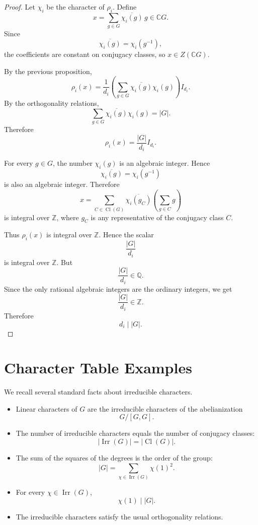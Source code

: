 \begin{proof}
Let \(\chi_i\) be the character of \(\rho_i\). Define
\[
x=\sum_{g\in G}\overline{\chi_i(g)}\,g\in \mathbb{C}G.
\]
Since
\[
\overline{\chi_i(g)}=\chi_i(g^{-1}),
\]
the coefficients are constant on conjugacy classes, so \(x\in Z(\mathbb{C}G)\).

By the previous proposition,
\[
\rho_i(x)
=
\frac{1}{d_i}
\left(\sum_{g\in G}\overline{\chi_i(g)}\chi_i(g)\right)I_{d_i}.
\]
By the orthogonality relations,
\[
\sum_{g\in G}\overline{\chi_i(g)}\chi_i(g)=|G|.
\]
Therefore
\[
\rho_i(x)=\frac{|G|}{d_i}I_{d_i}.
\]

For every \(g\in G\), the number \(\chi_i(g)\) is an algebraic integer. Hence
\[
\overline{\chi_i(g)}
=
\chi_i(g^{-1})
\]
is also an algebraic integer. Therefore
\[
x
=
\sum_{C\in \operatorname{Cl}(G)}
\overline{\chi_i(g_C)}
\left(\sum_{g\in C}g\right)
\]
is integral over \(\mathbb{Z}\), where \(g_C\) is any representative of the conjugacy class \(C\).

Thus \(\rho_i(x)\) is integral over \(\mathbb{Z}\). Hence the scalar
\[
\frac{|G|}{d_i}
\]
is integral over \(\mathbb{Z}\). But
\[
\frac{|G|}{d_i}\in \mathbb{Q}.
\]
Since the only rational algebraic integers are the ordinary integers, we get
\[
\frac{|G|}{d_i}\in \mathbb{Z}.
\]
Therefore
\[
d_i\mid |G|.
\]
\end{proof}

\section{Character Table Examples}

We recall several standard facts about irreducible characters.

\begin{itemize}
\item Linear characters of \(G\) are the irreducible characters of the abelianization
\[
G/[G,G].
\]

\item The number of irreducible characters equals the number of conjugacy classes:
\[
|\operatorname{Irr}(G)|=|\operatorname{Cl}(G)|.
\]

\item The sum of the squares of the degrees is the order of the group:
\[
|G|
=
\sum_{\chi\in \operatorname{Irr}(G)} \chi(1)^2.
\]

\item For every \(\chi\in \operatorname{Irr}(G)\),
\[
\chi(1)\mid |G|.
\]

\item The irreducible characters satisfy the usual orthogonality relations.
\end{itemize}

